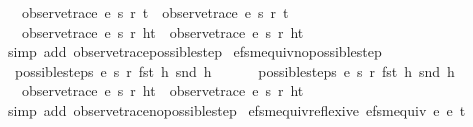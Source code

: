 \begin{isabellebody}
\ \ \ observe{\isacharunderscore}trace\ e{}\ s{}{\isacharprime}\ r{}{\isacharprime}\ t\ {\isacharequal}\ observe{\isacharunderscore}trace\ e{}\ s{}{\isacharprime}\ r{}{\isacharprime}\ t\ {\isasymLongrightarrow}\isanewline
\ \ \ observe{\isacharunderscore}trace\ e{}\ s{}\ r{}\ {\isacharparenleft}h{\isacharhash}t{\isacharparenright}\ {\isacharequal}\ observe{\isacharunderscore}trace\ e{}\ s{}\ r{}\ {\isacharparenleft}h{\isacharhash}t{\isacharparenright}{\isachardoublequoteclose}\isanewline
%
\isadelimproof
\ \ %
\endisadelimproof
%
\isatagproof
{}\isamarkupfalse%
\ {\isacharparenleft}simp\ add{\isacharcolon}\ observe{\isacharunderscore}trace{\isacharunderscore}possible{\isacharunderscore}step{\isacharparenright}%
\endisatagproof
{\isafoldproof}%
%
\isadelimproof
\isanewline
%
\endisadelimproof
\isanewline
{}\isamarkupfalse%
\ efsm{\isacharunderscore}equiv{\isacharunderscore}no{\isacharunderscore}possible{\isacharunderscore}step{\isacharcolon}\ \isanewline
\ \ {\isachardoublequoteopen}possible{\isacharunderscore}steps\ e{}\ s{}\ r{}\ {\isacharparenleft}fst\ h{\isacharparenright}\ {\isacharparenleft}snd\ h{\isacharparenright}\ {\isacharequal}\ {\isacharbraceleft}{\isacharbar}{\isacharbar}{\isacharbraceright}\ {\isasymLongrightarrow}\isanewline
\ \ \ possible{\isacharunderscore}steps\ e{}\ s{}\ r{}\ {\isacharparenleft}fst\ h{\isacharparenright}\ {\isacharparenleft}snd\ h{\isacharparenright}\ {\isacharequal}\ {\isacharbraceleft}{\isacharbar}{\isacharbar}{\isacharbraceright}\ {\isasymLongrightarrow}\isanewline
\ \ \ observe{\isacharunderscore}trace\ e{}\ s{}\ r{}\ {\isacharparenleft}h{\isacharhash}t{\isacharparenright}\ {\isacharequal}\ observe{\isacharunderscore}trace\ e{}\ s{}\ r{}\ {\isacharparenleft}h{\isacharhash}t{\isacharparenright}{\isachardoublequoteclose}\isanewline
%
\isadelimproof
\ \ %
\endisadelimproof
%
\isatagproof
{}\isamarkupfalse%
\ {\isacharparenleft}simp\ add{\isacharcolon}\ observe{\isacharunderscore}trace{\isacharunderscore}no{\isacharunderscore}possible{\isacharunderscore}step{\isacharparenright}%
\endisatagproof
{\isafoldproof}%
%
\isadelimproof
\isanewline
%
\endisadelimproof
\isanewline
{}\isamarkupfalse%
\ efsm{\isacharunderscore}equiv{\isacharunderscore}reflexive{\isacharcolon}\ {\isachardoublequoteopen}efsm{\isacharunderscore}equiv\ e{}\ e{}\ t{\isachardoublequoteclose}\isanewline

\end{isabellebody}
